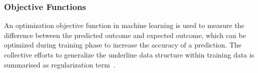 \subsubsection{Objective Functions}
An optimization objective function in machine learning is used to measure the difference between the predicted outcome and expected outcome, which can be optimized during training phase to increase the accuracy of a prediction. The collective efforts to generalize the underline data structure within training data is summarised as regularization term~\cite{goodfellow_2015}.  